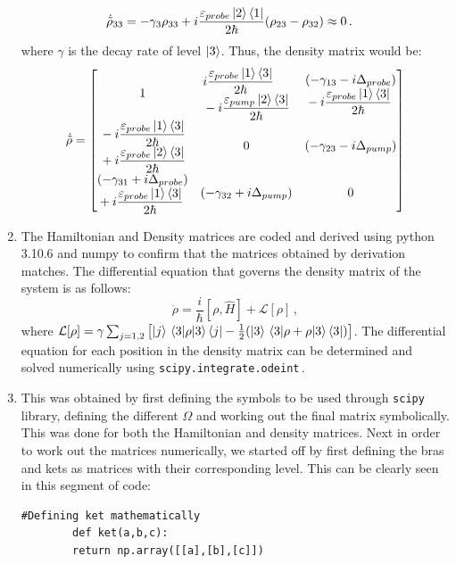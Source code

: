 \documentclass[12pt, a4paper]{article}
\begin{document}
\begin{enumerate}
\begin{align}
      \dot{\tilde{\rho}}_{33} &= - \gamma_{3} \rho_{33} + i \frac{\varepsilon_{probe}\ket{2}\bra{1}}{2\hbar}(\rho_{23}- \rho_{32}) \approx 0\,.
    \end{align}
    where \(\gamma\) is the decay rate of level \(\ket{3}\). Thus, the density matrix would be:
    \begin{gather}
      \dot{\tilde{\rho}} = 
      \begin{bmatrix}
        1 & \begin{split}&i \frac{\varepsilon_{probe}\ket{1}\bra{3}}{2\hbar}\\ &- i \frac{\varepsilon_{pump}\ket{2}\bra{3}}{2\hbar}\end{split} & \begin{split} &(- \gamma_{13} - i \Delta_{probe})\\&- i \frac{\varepsilon_{probe}\ket{1}\bra{3}}{2\hbar}\end{split}\\
        \begin{split}&-i \frac{\varepsilon_{probe}\ket{1}\bra{3}}{2\hbar}\\ &+ i \frac{\varepsilon_{probe}\ket{2}\bra{3}}{2\hbar}\end{split} & 0 & (-\gamma_{23}-i\Delta_{pump})\\
        \begin{split} &(- \gamma_{31} + i \Delta_{probe})\\&+ i \frac{\varepsilon_{probe}\ket{1}\bra{3}}{2\hbar}\end{split} & (-\gamma_{32}+i\Delta_{pump}) & 0 
      \end{bmatrix}
    \end{gather}
    \item  The Hamiltonian and Density matrices are coded and derived using python 3.10.6 and numpy to confirm that the matrices obtained by derivation matches. The differential equation that governs the density matrix of the system is as follows:
    \begin{equation}
      \dot{\rho} = \frac{i}{\hbar}\left[\rho,\hat{H}\right] + \mathcal{L} [\rho]\,,
    \end{equation}
    where \(\mathcal{L}[\rho] = \gamma \sum_{j = 1,2}\left[\ket{j}\ev{\rho}{3}\bra{j}-\frac{1}{2}(\ket{3}\ev{\rho+\rho}{3}\bra{3})\right]\). The differential equation for each position in the density matrix can be determined and solved numerically using \lstinline{scipy.integrate.odeint}\,.
    \item This was obtained by first defining the symbols to be used through \lstinline{scipy} library, defining the different \(\Omega\) and working out the final matrix symbolically. This was done for both the Hamiltonian and density matrices. Next in order to work out the matrices numerically, we started off by first defining the bras and kets as matrices with their corresponding level. This can be clearly seen in this segment of code:
    \begin{lstlisting}[language=iPython]
      #Defining ket mathematically
        def ket(a,b,c):
        return np.array([[a],[b],[c]])


\end{lstlisting}
\end{enumerate}
\end{document}
